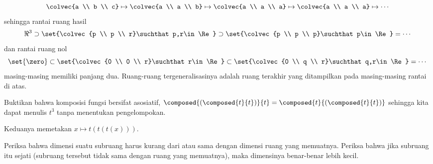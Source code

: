 \begin{exercises}
\begin{answer}
\begin{exparts}
\begin{equation*}
             \colvec{a \\ b \\ c}
                \mapsto\colvec{a \\ a \\ b}
                \mapsto\colvec{a \\ a \\ a}
                \mapsto\colvec{a \\ a \\ a}
                \mapsto\cdots
           \end{equation*}
           sehingga rantai ruang hasil
           \begin{equation*}
             \Re^3
               \supset\set{\colvec{p \\ p \\ r}\suchthat p,r\in\Re}
               \supset\set{\colvec{p \\ p \\ p}\suchthat p\in\Re}
               =\cdots
           \end{equation*}
           dan rantai ruang nol
           \begin{equation*}
             \set{\zero}
                 \subset\set{\colvec{0 \\ 0 \\ r}\suchthat r\in \Re}
                 \subset\set{\colvec{0 \\ q \\ r}\suchthat q,r\in \Re}
                =\cdots
           \end{equation*}
           masing-masing memiliki panjang dua.
           Ruang-ruang tergeneralisasinya adalah ruang terakhir yang ditampilkan
           pada masing-masing rantai di atas.
      \end{exparts}
     \end{answer}
  \item 
    Buktikan bahwa komposisi fungsi bersifat asosiatif,
    \( \composed{(\composed{t}{t})}{t}=\composed{t}{(\composed{t}{t})} \)
    sehingga kita dapat menulis $t^3$ tanpa menentukan pengelompokan.
    \begin{answer}
      Keduanya memetakan \( x\mapsto t(t(t(x))) \).
    \end{answer}
  \item \label{exer:PropSubspStrictLowerDimen}
    Periksa bahwa dimensi suatu subruang harus kurang dari atau sama dengan
    dimensi ruang yang memuatnya.
    Periksa bahwa jika subruang itu sejati (subruang tersebut tidak sama dengan
    ruang yang memuatnya), maka dimensinya benar-benar lebih kecil.

\end{exercises}
